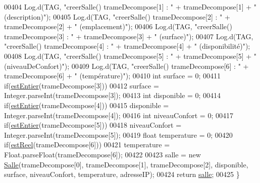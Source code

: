 \begin{DoxyCode}
00404             Log.d(TAG, \textcolor{stringliteral}{"creerSalle() trameDecompose[1] : "} + trameDecompose[1] + \textcolor{stringliteral}{" (description)"});
00405             Log.d(TAG, \textcolor{stringliteral}{"creerSalle() trameDecompose[2] : "} + trameDecompose[2] + \textcolor{stringliteral}{" (emplacement)"});
00406             Log.d(TAG, \textcolor{stringliteral}{"creerSalle() trameDecompose[3] : "} + trameDecompose[3] + \textcolor{stringliteral}{" (surface)"});
00407             Log.d(TAG, \textcolor{stringliteral}{"creerSalle() trameDecompose[4] : "} + trameDecompose[4] + \textcolor{stringliteral}{" (disponibilité)"});
00408             Log.d(TAG, \textcolor{stringliteral}{"creerSalle() trameDecompose[5] : "} + trameDecompose[5] + \textcolor{stringliteral}{" (niveauDeConfort)"});
00409             Log.d(TAG, \textcolor{stringliteral}{"creerSalle() trameDecompose[6] : "} + trameDecompose[6] + \textcolor{stringliteral}{" (température)"});
00410             \textcolor{keywordtype}{int} surface = 0;
00411             \textcolor{keywordflow}{if}(\hyperlink{classcom_1_1lasalle_1_1meeting_1_1_main_activity_a3841414e5b270c189de0d58bbd2aca57}{estEntier}(trameDecompose[3]))
00412                 surface = Integer.parseInt(trameDecompose[3]);
00413             \textcolor{keywordtype}{int} disponible = 0;
00414             \textcolor{keywordflow}{if}(\hyperlink{classcom_1_1lasalle_1_1meeting_1_1_main_activity_a3841414e5b270c189de0d58bbd2aca57}{estEntier}(trameDecompose[4]))
00415                 disponible = Integer.parseInt(trameDecompose[4]);
00416             \textcolor{keywordtype}{int} niveauConfort = 0;
00417             \textcolor{keywordflow}{if}(\hyperlink{classcom_1_1lasalle_1_1meeting_1_1_main_activity_a3841414e5b270c189de0d58bbd2aca57}{estEntier}(trameDecompose[5]))
00418                 niveauConfort = Integer.parseInt(trameDecompose[5]);
00419             \textcolor{keywordtype}{float} temperature = 0;
00420             \textcolor{keywordflow}{if}(\hyperlink{classcom_1_1lasalle_1_1meeting_1_1_main_activity_a8d0cd387540353465b1982157b20631c}{estReel}(trameDecompose[6]))
00421                 temperature = Float.parseFloat(trameDecompose[6]);
00422 
00423             salle = \textcolor{keyword}{new} \hyperlink{classcom_1_1lasalle_1_1meeting_1_1_salle}{Salle}(trameDecompose[0], trameDecompose[1], trameDecompose[2], disponible, 
      surface, niveauConfort, temperature, adresseIP);
00424             \textcolor{keywordflow}{return} \hyperlink{classcom_1_1lasalle_1_1meeting_1_1_main_activity_a5d76e925ebb88ff19eca5a30b5ca4588}{salle};
00425         \}

\end{DoxyCode}
